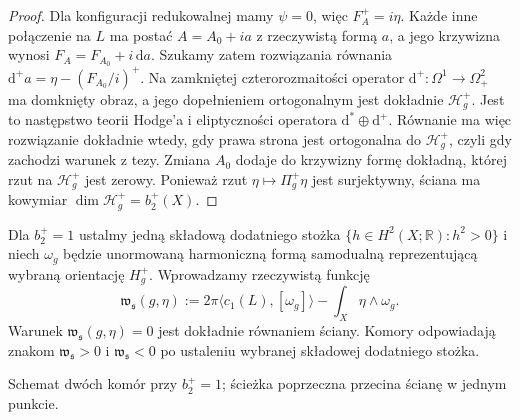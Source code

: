 \begin{proof}
Dla konfiguracji redukowalnej mamy $\psi=0$, więc
$F_A^+=i\eta$. Każde inne połączenie na $L$ ma postać
$A=A_0+ia$ z rzeczywistą formą $a$, a jego krzywizna
wynosi $F_A=F_{A_0}+i\,\mathrm da$.
Szukamy zatem rozwiązania równania
$\mathrm d^+a=\eta-(F_{A_0}/i)^+$.
Na zamkniętej czterorozmaitości operator
$\mathrm d^+:\Omega^1\to\Omega^2_+$ ma domknięty obraz,
a jego dopełnieniem ortogonalnym jest dokładnie
$\mathcal H_g^+$. Jest to następstwo teorii Hodge'a
i eliptyczności operatora $\mathrm d^*\oplus\mathrm d^+$.
Równanie ma więc rozwiązanie dokładnie wtedy, gdy
prawa strona jest ortogonalna do $\mathcal H_g^+$,
czyli gdy zachodzi warunek z tezy.
Zmiana $A_0$ dodaje do krzywizny formę dokładną,
której rzut na $\mathcal H_g^+$ jest zerowy.
Ponieważ rzut $\eta\mapsto\Pi_g^+\eta$ jest surjektywny,
ściana ma kowymiar $\dim\mathcal H_g^+=b_2^+(X)$.
\end{proof}

Dla $b_2^+=1$ ustalmy jedną składową dodatniego stożka
$\{h\in H^2(X;\mathbb R):h^2>0\}$ i niech
$\omega_g$ będzie unormowaną harmoniczną formą
samodualną reprezentującą wybraną orientację $H_g^+$.
Wprowadzamy rzeczywistą funkcję
\[
\mathfrak w_{\mathfrak s}(g,\eta)
:=2\pi\langle c_1(L),[\omega_g]\rangle
-\int_X\eta\wedge\omega_g.
\]
Warunek $\mathfrak w_{\mathfrak s}(g,\eta)=0$ jest dokładnie
równaniem ściany. Komory odpowiadają znakom
$\mathfrak w_{\mathfrak s}>0$ i $\mathfrak w_{\mathfrak s}<0$
po ustaleniu wybranej składowej dodatniego stożka.

\begin{center}

{\footnotesize Schemat dwóch komór przy $b_2^+=1$; ścieżka poprzeczna
przecina ścianę w jednym punkcie.}
\end{center}

